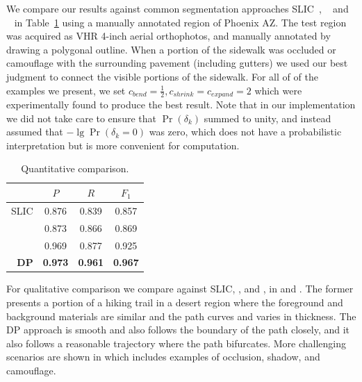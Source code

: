 We compare our results against common segmentation approaches 
\ac{SLIC}~\cite{Achanta2012-ah}, \ActiveContours{}~\cite{ActiveContou09} and \GrabCut{}~\cite{Rother2004-ou} 
in Table~\ref{tab:quantitative-against-common} using a manually annotated region of 
Phoenix AZ. The test region was acquired as \ac{VHR} 4-inch aerial orthophotos, 
and manually annotated by drawing a polygonal outline. 
When a portion of the sidewalk was occluded or camouflage with the surrounding pavement 
(including gutters) we used our best judgment to connect the visible portions of the sidewalk. For all of of the examples we present, we set $c_\mathit{bend}=\frac{1}{2}, c_\mathit{shrink}=c_\mathit{expand}=2$ which were experimentally found to produce the best result. Note that in our implementation we did not take care to ensure that $\Pr(\delta_k)$ summed to unity, and instead assumed that $-\lg \Pr(\delta_k=0)$ was zero, which does not have a probabilistic interpretation but is more convenient for computation. 

\begin{table}[h!]
    \caption{Quantitative comparison. }
    \label{tab:quantitative-against-common}
    \centering
    \begin{tabular}{r ccc}
                            & $P$ & $R$& $F_1$ \\ 
                                 \hline 
                  \ac{SLIC} & 0.876 & 0.839 & 0.857 \\
          \ActiveContours{} & 0.873 & 0.866 & 0.869  \\
                 \GrabCut{} & 0.969 & 0.877 & 0.925  \\ 
                                 \hline
                \textbf{DP} & \textbf{0.973} & \textbf{0.961} & \textbf{0.967}   
    \end{tabular}
\end{table}

For qualitative comparison we compare against \ac{SLIC}, \ActiveContours{}, and \GrabCut{}, in  and .  The former presents a portion of a hiking trail in a desert region where the foreground and background materials are similar and the path curves and varies in thickness. The \ac{DP} approach is smooth and also follows the boundary of the path closely, and it also follows a reasonable trajectory where the path bifurcates. More challenging scenarios are shown in  which includes examples of occlusion, shadow, and camouflage.  

